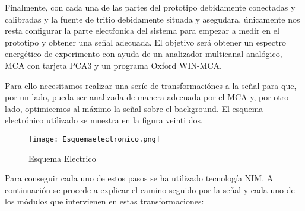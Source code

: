 Finalmente, con cada una de las partes del prototipo debidamente conectadas y calibradas y la fuente de tritio debidamente situada y asegudara, únicamente nos resta configurar la parte electŕonica del sistema para empezar a medir en el prototipo y obtener una señal adecuada. El objetivo será obtener un espectro energético de experimento con ayuda de un analizador multicanal analógico, MCA con tarjeta PCA3 y un programa Oxford WIN-MCA. 

Para ello necesitamos realizar una seríe de transformaciónes a la señal para que, por un lado,  pueda ser analizada de manera adecuada por el MCA y, por otro lado, optimicemos al máximo la señal sobre el background. El esquema electrónico utilizado se muestra en la figura veinti dos.

\begin{figure}[hbtp]
\centering
\texttt{[image: Esquemaelectronico.png]}
\caption{Esquema Electrico~\cite{Andres}}
\end{figure}

Para conseguir cada uno de estos pasos se ha utilizado tecnología NIM. A continuación se procede a explicar el camino seguido por la señal y cada uno de los módulos que intervienen en estas transformaciones:

